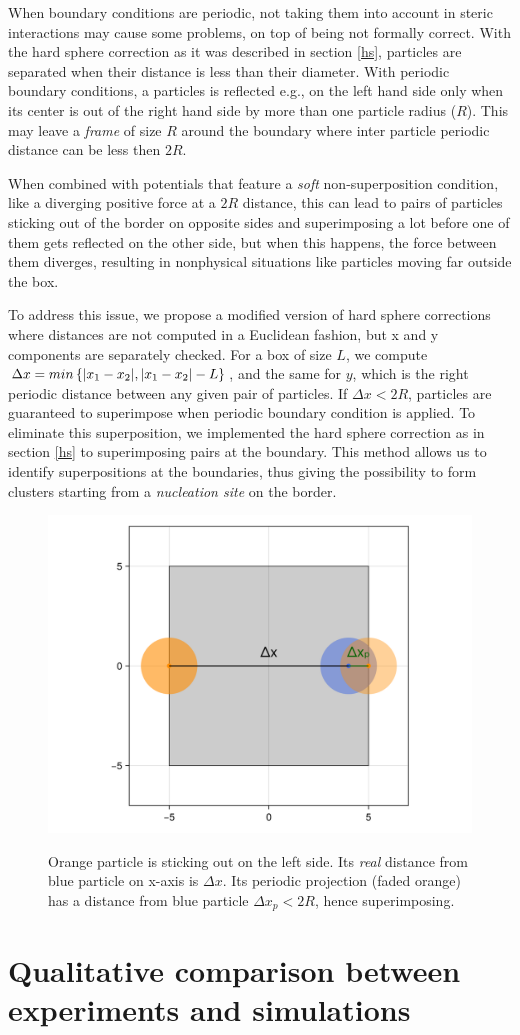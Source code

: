 \documentclass[../../master_thesis_np.tex]{subfiles}
\begin{document}
	When boundary conditions are periodic, not taking them into account in steric interactions may cause some problems, on top of being not formally correct. With the hard sphere correction as it was described in section \ref{hs}, particles are separated when their distance is less than their diameter. With periodic boundary conditions, a particles is reflected e.g., on the left hand side only when its center is out of the right hand side by more than one particle radius ($R$). This may leave a \emph{frame} of size $R$ around the boundary where inter particle periodic distance can be less then $2R$. 
	
	When combined with potentials that feature a \emph{soft} non-superposition condition, like a diverging positive force at a $2R$ distance, this can lead to pairs of particles sticking out of the border on opposite sides and superimposing a lot before one of them gets reflected on the other side, but when this happens, the force between them diverges, resulting in nonphysical situations like particles moving far outside the box.
	
	To address this issue, we propose a modified version of hard sphere corrections where distances are not computed in a Euclidean fashion, but x and y components are separately checked. For a box of size $L$, we compute $\Delta x = min \left\{ \abs{x_1-x_2}, \abs{x_1-x_2}-L \right\}$, and the same for $y$, which is the right periodic distance between any given pair of particles. If $\Delta x < 2R$, particles are guaranteed to superimpose when periodic boundary condition is applied. To eliminate this superposition, we implemented the hard sphere correction as in section \ref{hs} to superimposing pairs at the boundary. This method allows us to identify superpositions at the boundaries, thus giving the possibility to form clusters starting from a \emph{nucleation site} on the border. 
	
	\begin{figure}[htp]
		\centering
		\includegraphics[width = \textwidth]{periodic_hs.png}
		\label{fig:periodic_hs}
		\caption{Orange particle is sticking out on the left side. Its \emph{real} distance from blue particle on x-axis is $\Delta x$. Its periodic projection (faded orange) has a distance from blue particle $\Delta x_p < 2R$, hence superimposing.}
	\end{figure}
	
	\section{Qualitative comparison between experiments and simulations} \label{qualitative}
	
\end{document}
